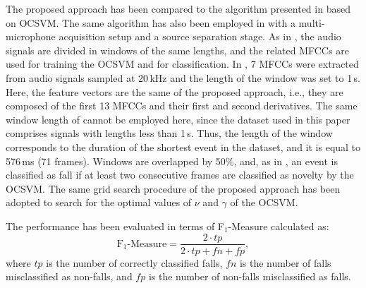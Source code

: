 The proposed approach has been compared to the algorithm presented in \cite{Popescu2009} based on OCSVM. The same algorithm has also been employed in \cite{khan2015unsupervised} with a multi-microphone acquisition setup and a source separation stage. As in \cite{Popescu2009}, the audio signals are divided in windows of the same lengths, and the related MFCCs are used for training the OCSVM and for classification. In \cite{Popescu2009}, 7 MFCCs were extracted from audio signals sampled at 20\,kHz and the length of the window was set to 1\,s. Here, the feature vectors are the same of the proposed approach, i.e., they are composed of the first 13 MFCCs and their first and second derivatives. The same window length of \cite{Popescu2009} cannot be employed here, since the dataset used in this paper comprises signals with lengths less than 1\,s. Thus, the length of the window corresponds to the duration of the shortest event in the dataset, and it is equal to 576\,ms (71 frames). Windows are overlapped by 50\%, and, as in \cite{Popescu2009}, an event is classified as fall if at least two consecutive frames are classified as novelty by the OCSVM. The same grid search procedure of the proposed approach has been adopted to search for the optimal values of $\nu$ and $\gamma$ of the OCSVM.


The performance has been evaluated in terms of F$_1$-Measure calculated as:
\begin{equation}
\text{F}_1\text{-Measure} = \frac{2\cdot tp}{2\cdot tp+fn+fp},
\end{equation}
where $tp$ is the number of correctly classified falls, $fn$ is the number of falls misclassified as non-falls, and $fp$ is the number of non-falls misclassified as falls.


